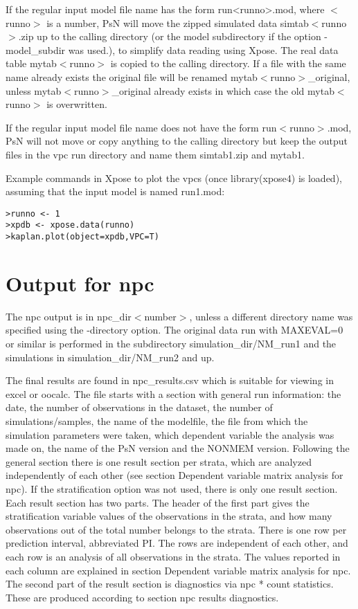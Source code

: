 If the regular input model file name has the form run<runno>.mod, where $<$runno$>$ is a number, PsN will move the zipped simulated data simtab$<$runno$>$.zip up to the calling directory (or the model subdirectory if the option -model\_subdir was used.), to simplify data reading using Xpose. The real data table mytab$<$runno$>$ is copied to the calling directory. If a file with the same name already exists the original file will be renamed mytab$<$runno$>$\_original, unless mytab$<$runno$>$\_original already exists in which case the old mytab$<$runno$>$ is overwritten. 

If the regular input model file name does not have the form run$<$runno$>$.mod, PsN will not move or copy anything to the calling directory but keep the output files in the vpc run directory and name them simtab1.zip and mytab1. 

Example commands in Xpose to plot the vpcs (once library(xpose4) is loaded), assuming that the input model is named run1.mod:
\begin{verbatim}
>runno <- 1
>xpdb <- xpose.data(runno)
>kaplan.plot(object=xpdb,VPC=T)
\end{verbatim}

\section{Output for npc}
The npc output is in npc\_dir$<$number$>$, unless a different directory name was specified using the -directory option. The original data run with MAXEVAL=0 or similar is performed in the subdirectory simulation\_dir/NM\_run1 and the simulations in simulation\_dir/NM\_run2 and up. 

The final results are found in npc\_results.csv which is suitable for viewing in excel or oocalc.  The file starts with a section with general run information: the date, the number of observations in the dataset, the number of simulations/samples, the name of the modelfile, the file from which the simulation parameters were taken, which dependent variable the analysis was made on, the name of the PsN version and the NONMEM version. Following the general section there is one result section per strata, which are analyzed independently of each other (see section Dependent variable matrix analysis for npc). If the stratification option was not used, there is only one result section. Each result section has two parts. The header of the first part gives the stratification variable values of the observations in the strata, and how many observations out of the total number belongs to the strata. There is one row per prediction interval, abbreviated PI. The rows are independent of each other, and each row is an analysis of all observations in the strata. The values reported in each column are explained in section Dependent variable matrix analysis for npc. The second part of the result section is diagnostics via npc * count statistics. These are produced according to section npc results diagnostics.	

